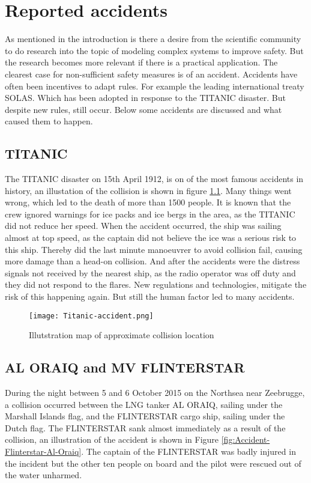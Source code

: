 \chapter{Reported accidents}
\label{sec:accidents}
As mentioned in the introduction is there a desire from the scientific community to do research into the topic of modeling complex systems to improve safety. But the research becomes more relevant if there is a practical application. The clearest case for non-sufficient safety measures is of an accident. Accidents have often been incentives to adapt rules. For example the leading international treaty \ac{SOLAS}. Which has been adopted in response to the TITANIC disaster. But despite new rules, still occur. Below some accidents are discussed and what caused them to happen.

\section{TITANIC}
The TITANIC disaster on 15th April 1912, is on of the most famous accidents in history, an illustation of the collision is shown in figure \ref{fig:Accident-Titanic}. Many things went wrong, which led to the death of more than 1500 people. It is known that the crew ignored warnings for ice packs and ice bergs in the area, as the TITANIC did not reduce her speed. When the accident occurred, the ship was sailing almost at top speed, as the captain did not believe the ice was a serious risk to this ship. Thereby did the last minute manoeuvrer to avoid collision fail, causing more damage than a head-on collision. And after the accidents were the distress signals not received by the nearest ship, as the radio operator was off duty and they did not respond to the flares. New regulations and technologies, mitigate the risk of this happening again. But still the human factor led to many accidents.

\begin{figure}[H]
	\centering
	\texttt{[image: Titanic-accident.png]}
	\caption{Illutstration map of approximate collision location}
	\label{fig:Accident-Titanic}
\end{figure}

\newpage
\section{AL ORAIQ and MV FLINTERSTAR}
During the night between 5 and 6 October 2015 on the Northsea near Zeebrugge, a collision occurred between the LNG tanker AL ORAIQ, sailing under the Marshall Islands flag, and the FLINTERSTAR cargo ship, sailing under the Dutch flag. The FLINTERSTAR sank almost immediately as a result of the collision, an illustration of the accident is shown in Figure \ref{fig:Accident-Flinterstar-Al-Oraiq}. The captain of the FLINTERSTAR was badly injured in the incident but the other ten people on board and the pilot were rescued out of the water unharmed.

